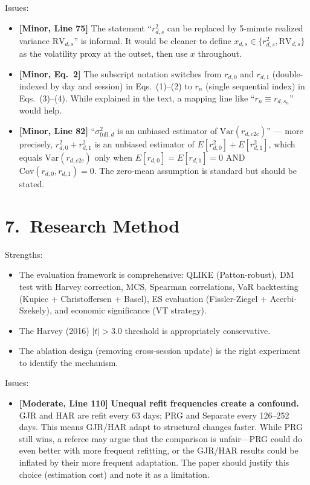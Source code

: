 \documentclass[12pt,a4paper]{article}
\begin{document}
\noindent Issues:
\begin{itemize}[nosep]
\item [L1] \textbf{[Minor, Line 75]} The statement ``$r^2_{d,s}$ can be replaced by 5-minute realized variance $\text{RV}_{d,s}$'' is informal. It would be cleaner to define $x_{d,s} \in \{r^2_{d,s}, \text{RV}_{d,s}\}$ as the volatility proxy at the outset, then use $x$ throughout.
\item [L2] \textbf{[Minor, Eq.~2]} The subscript notation switches from $r_{d,0}$ and $r_{d,1}$ (double-indexed by day and session) in Eqs.~(1)--(2) to $r_n$ (single sequential index) in Eqs.~(3)--(4). While explained in the text, a mapping line like ``$r_n \equiv r_{d,s_n}$'' would help.
\item [L3] \textbf{[Minor, Line 82]} ``$\sigma^2_{\text{full},d}$ is an unbiased estimator of $\text{Var}(r_{d,c2c})$'' --- more precisely, $r^2_{d,0} + r^2_{d,1}$ is an unbiased estimator of $E[r^2_{d,0}] + E[r^2_{d,1}]$, which equals $\text{Var}(r_{d,c2c})$ only when $E[r_{d,0}] = E[r_{d,1}] = 0$ AND $\text{Cov}(r_{d,0}, r_{d,1}) = 0$. The zero-mean assumption is standard but should be stated.
\end{itemize}

\bigskip

\section*{7.\ Research Method}

\noindent \textcolor{okgreen}{Strengths:}
\begin{itemize}[nosep]
\item The evaluation framework is comprehensive: QLIKE (Patton-robust), DM test with Harvey correction, MCS, Spearman correlations, VaR backtesting (Kupiec + Christoffersen + Basel), ES evaluation (Fissler-Ziegel + Acerbi-Szekely), and economic significance (VT strategy).
\item The Harvey (2016) $|t|>3.0$ threshold is appropriately conservative.
\item The ablation design (removing cross-session update) is the right experiment to identify the mechanism.
\end{itemize}

\noindent \textcolor{warncolor}{Issues:}
\begin{itemize}[nosep]
\item [\textcolor{warncolor}{M9}] \textbf{[Moderate, Line 110]} \textbf{Unequal refit frequencies create a confound.} GJR and HAR are refit every 63 days; PRG and Separate every 126--252 days. This means GJR/HAR adapt to structural changes faster. While PRG still wins, a referee may argue that the comparison is unfair---PRG could do even better with more frequent refitting, or the GJR/HAR results could be inflated by their more frequent adaptation. The paper should justify this choice (estimation cost) and note it as a limitation.
\end{itemize}
\end{document}
